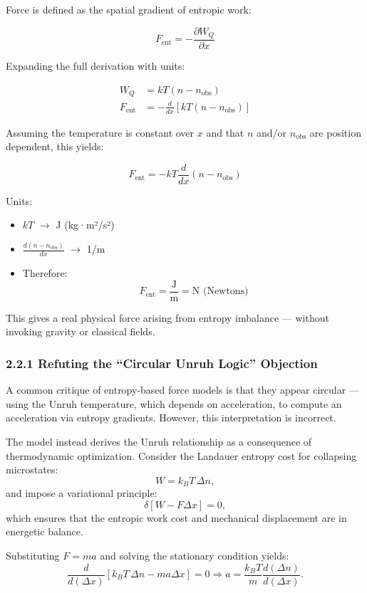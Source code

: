 \documentclass[12pt]{article}
\begin{document}
Force is defined as the spatial gradient of entropic work:

\[
F_{\text{ent}} = -\frac{\partial W_Q}{\partial x}
\]

Expanding the full derivation with units:

\begin{align*}
W_Q &= kT(n - n_{\text{obs}}) \\
F_{\text{ent}} &= -\frac{d}{dx} \left[kT(n - n_{\text{obs}})\right]
\end{align*}

Assuming the temperature is constant over $x$ and that $n$ and/or $n_{\text{obs}}$ are position dependent, this yields:

\[
F_{\text{ent}} = -kT \frac{d}{dx}(n - n_{\text{obs}})
\]

Units:
\begin{itemize}
    \item $kT$ $\rightarrow$ J (kg·m²/s²)
    \item $\frac{d(n - n_{\text{obs}})}{dx}$ $\rightarrow$ 1/m
    \item Therefore:
    \[
    F_{\text{ent}} = \frac{\text{J}}{\text{m}} = \text{N (Newtons)}
    \]
\end{itemize}

This gives a real physical force arising from entropy imbalance — without invoking gravity or classical fields.

\subsubsection*{2.2.1 Refuting the “Circular Unruh Logic” Objection}

A common critique of entropy-based force models is that they appear circular — using the Unruh temperature, which depends on acceleration, to compute an acceleration via entropy gradients. However, this interpretation is incorrect.

The model instead derives the Unruh relationship as a consequence of thermodynamic optimization. Consider the Landauer entropy cost for collapsing microstates:
\[
W = k_B T\, \Delta n,
\]
and impose a variational principle:
\[
\delta\left[ W - F \Delta x \right] = 0,
\]
which ensures that the entropic work cost and mechanical displacement are in energetic balance.

Substituting \( F = m a \) and solving the stationary condition yields:
\[
\frac{d}{d(\Delta x)} \left[ k_B T\, \Delta n - m a \Delta x \right] = 0
\Rightarrow a = \frac{k_B T}{m} \frac{d(\Delta n)}{d(\Delta x)}.
\]
\end{document}
